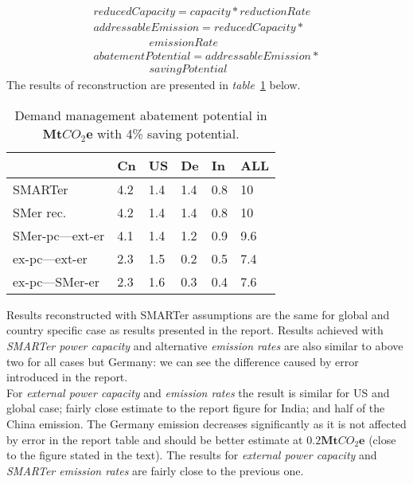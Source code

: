 \documentclass[11pt, twocolumn]{article}
\begin{document}
\begin{gather*}
  reducedCapacity = capacity * reductionRate\\
  addressableEmission = reducedCapacity *\\
  \quad\quad\quad\quad\quad emissionRate\\
  abatementPotential = addressableEmission *\\
  \quad\quad\quad\quad\quad savingPotential
\end{gather*}
The results of reconstruction are presented in \emph{table}~\ref{tab:dm} below.
\begin{center}
  \begin{table}[h]
    \begin{tabular}{ p{} | p{} | p{} | p{} | p{} | p{} }
       & Cn & US & De & In & ALL \\
      \hline
      SMARTer & 4.2 & 1.4 & 1.4 & 0.8 & 10 \\
      SMer rec. & 4.2 & 1.4 & 1.4 & 0.8 & 10 \\
      SMer-pc---ext-er & 4.1 & 1.4 & 1.2 & 0.9 & 9.6 \\
      ex-pc---ext-er & 2.3 & 1.5 & 0.2 & 0.5 & 7.4 \\
      ex-pc---SMer-er & 2.3 & 1.6 & 0.3 & 0.4 & 7.6
    \end{tabular}
    \caption{Demand management abatement potential in $\mathbf{Mt}CO_2\mathbf{e}$ with 4\% saving potential. \label{tab:dm}}
  \end{table}
\end{center}
Results reconstructed with SMARTer assumptions are the same for global and country specific case as results presented in the report. Results achieved with \emph{SMARTer power capacity} and alternative \emph{emission rates} are also similar to above two for all cases but Germany: we can see the difference caused by error introduced in the report.\\
For \emph{external power capacity} and \emph{emission rates} the result is similar for US and global case; fairly close estimate to the report figure for India; and half of the China emission. The Germany emission decreases significantly as it is not affected by error in the report table and should be better estimate at $\mathbf{0.2Mt}CO_2\mathbf{e}$ (close to the figure stated in the text). The results for \emph{external power capacity} and \emph{SMARTer emission rates} are fairly close to the previous one.
\end{document}
